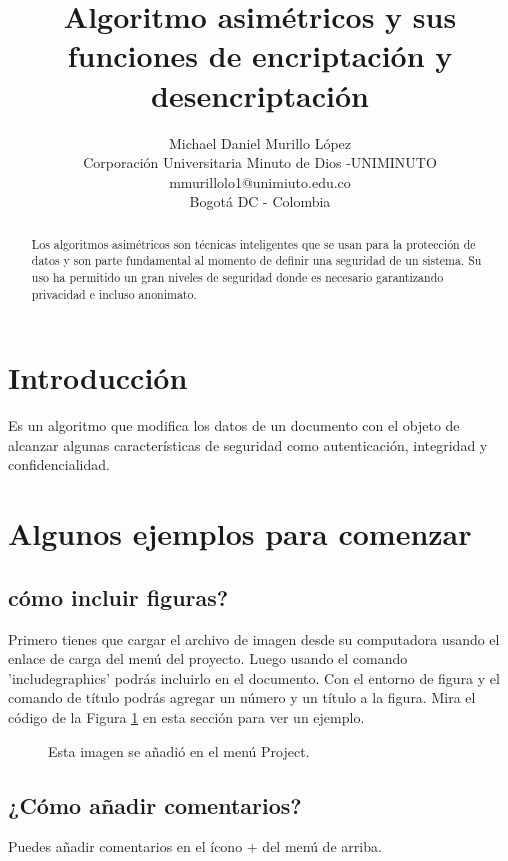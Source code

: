 \documentclass[a4paper]{article}
\title{Algoritmo asimétricos y sus funciones de encriptación y desencriptación}
\author{Michael Daniel Murillo López\\
  \small Corporación Universitaria Minuto de Dios -UNIMINUTO\\
  \small mmurillolo1@unimiuto.edu.co\\
  \small Bogotá DC - Colombia
  \date{}
}
\begin{document}
\maketitle
 
\begin{abstract}
Los algoritmos  asimétricos son técnicas inteligentes que se usan para la protección  de datos  y  son parte fundamental al momento de definir una seguridad de un sistema. Su uso ha permitido un gran niveles de seguridad donde es necesario garantizando privacidad e incluso anonimato. 

\end{abstract}

\section{Introducci\'on}

Es un algoritmo que modifica los datos de un documento con el objeto de alcanzar algunas características de seguridad como autenticación, integridad y confidencialidad.

\section{Algunos ejemplos para comenzar}

\subsection{cómo incluir figuras?}

Primero tienes que cargar el archivo de imagen desde su computadora usando el enlace de carga del menú del proyecto. Luego usando el comando 'includegraphics' podrás incluirlo en el documento. Con el entorno de figura y el comando de título podrás agregar un número y un título a la figura. Mira el código de la Figura \ref{fig:tesla} en esta sección para ver un ejemplo.

\begin{figure}
\centering
\caption{\label{fig:tesla}Esta imagen se añadió en el menú Project.}
\end{figure}


\subsection{¿Cómo añadir comentarios?}

Puedes añadir comentarios en el ícono + del menú de arriba.
\end{document}
